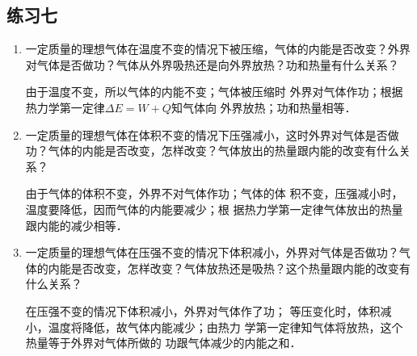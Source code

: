 \subsection{练习七}
\begin{enumerate}
	\item 一定质量的理想气体在温度不变的情况下被压缩，气体的内能是否改变？外界对气体是否做功？气体从外界吸热还是向外界放热？功和热量有什么关系？

    \begin{solution}
        由于温度不变，所以气体的内能不变；气体被压缩时
外界对气体作功；根据热力学第一定律$\Delta E=W+Q$知气体向
外界放热；功和热量相等．
    \end{solution}
\item 一定质量的理想气体在体积不变的情况下压强减小，这时外界对气体是否做功？气体的内能是否改变，怎样改变？气体放出的热量跟内能的改变有什么关系？

\begin{solution}
    由于气体的体积不变，外界不对气体作功；气体的体
积不变，压强减小时，温度要降低，因而气体的内能要减少；根
据热力学第一定律气体放出的热量跟内能的减少相等．
\end{solution}
\item 一定质量的理想气体在压强不变的情况下体积减小，外界对气体是否做功？气体的内能是否改变，怎样改变？气体放热还是吸热？这个热量跟内能的改变有什么关系？

\begin{solution}
    在压强不变的情况下体积减小，外界对气体作了功；
等压变化时，体积减小，温度将降低，故气体内能减少；由热力
学第一定律知气体将放热，这个热量等于外界对气体所做的
功跟气体减少的内能之和．
\end{solution}
\end{enumerate}


